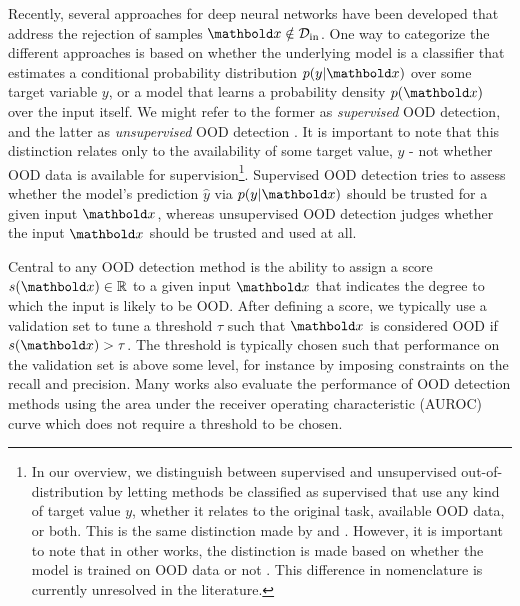 Recently, several approaches for deep neural networks have been developed that address the rejection of samples $\xb\notin\mathcal{D}_{\text{in}}$. 
One way to categorize the different approaches is based on whether the underlying model is a classifier that estimates a conditional probability distribution $p(y|\xb)$ over some target variable $y$, or a model that learns a probability density $p(\xb)$ over the input itself. We might refer to the former as \emph{supervised} OOD detection, and the latter as \emph{unsupervised} OOD detection \parencite{graham_denoising_2023,liu_unsupervised_2023a}. It is important to note that this distinction relates only to the availability of some target value, $y$ - not whether OOD data is available for supervision\footnote{
    In our overview, we distinguish between supervised and unsupervised out-of-distribution by letting methods be classified as supervised that use any kind of target value $y$, whether it relates to the original task, available OOD data, or both. This is the same distinction made by \textcite{graham_denoising_2023} and \textcite{liu_unsupervised_2023a}. 
    However, it is important to note that in other works, the distinction is made based on whether the model is trained on OOD data or not \parencite{hendrycks_baseline_2017,liu_energy-based_2020}. This difference in nomenclature is currently unresolved in the literature. 
}. 
Supervised OOD detection tries to assess whether the model's prediction $\hat{y}$ via $p(y|\xb)$ should be trusted for a given input $\xb$, whereas unsupervised OOD detection judges whether the input $\xb$ should be trusted and used at all. 

Central to any OOD detection method is the ability to assign a score $s(\xb) \in \mathbb{R}$ to a given input $\xb$ that indicates the degree to which the input is likely to be OOD. After defining a score, we typically use a validation set to tune a threshold $\tau$ such that $\xb$ is considered OOD if $s(\xb) > \tau$. The threshold is typically chosen such that performance on the validation set is above some level, for instance by imposing constraints on the recall and precision. Many works also evaluate the performance of OOD detection methods using the area under the receiver operating characteristic (AUROC) curve which does not require a threshold to be chosen.


